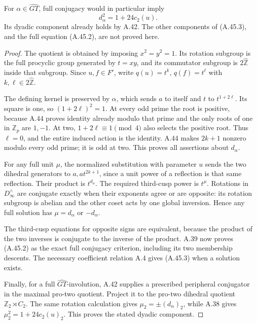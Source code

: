 For \(\alpha\in\widehat{GT}\), full conjugacy
would in particular imply
\[
                         d_\alpha^2=1+24c_2(u).
 \tag{A.45.3}
\]
Its dyadic component already holds by A.42.
The other components of (A.45.3), and the full
equation (A.45.2), are not proved here.

\begin{proof}
The quotient is obtained by imposing
\(x^2=y^2=1\). Its rotation subgroup is the
full procyclic group generated by \(t=xy\),
and its commutator subgroup is
\(2\widehat{\mathbb Z}\) inside that subgroup.
Since \(u,f\in F'\), write
\(q(u)=t^k\), \(q(f)=t^\ell\) with
\(k,\ell\in2\widehat{\mathbb Z}\).

The defining kernel is preserved by
\(\alpha\), which sends \(a\) to itself
and \(t\) to \(t^{1+2\ell}\).
Its square is one, so \((1+2\ell)^2=1\).
At every odd prime the root is positive,
because A.44 proves identity already modulo
that prime and the only roots of one in
\(\mathbb Z_p\) are \(1,-1\).
At two, \(1+2\ell\equiv1\pmod4\)
also selects the positive root. Thus
\(\ell=0\), and the entire induced action
is the identity. A.44 makes \(2k+1\)
nonzero modulo every odd prime; it is odd
at two. This proves all assertions about
\(d_\alpha\).

For any full unit \(\mu\), the normalized
substitution with parameter \(u\) sends the
two dihedral generators to
\(a,at^{2k+1}\), since a unit power of a
reflection is that same reflection. Their
product is \(t^{d_\alpha}\). The required
third-cusp power is \(t^\mu\). Rotations in
\(D_\infty^{\wedge}\) are conjugate exactly
when their exponents agree or are opposite:
its rotation subgroup is abelian and the
other coset acts by one global inversion.
Hence any full solution has
\(\mu=d_\alpha\) or \(-d_\alpha\).

The third-cusp equations for opposite signs
are equivalent, because the product of the
two inverses is conjugate to the inverse
of the product. A.39 now proves (A.45.2)
as the exact full conjugacy criterion,
including its two membership descents.
The necessary coefficient relation A.4
gives (A.45.3) when a solution exists.

Finally, for a full \(\widehat{GT}\)-involution,
A.42 supplies a prescribed peripheral
conjugator in the maximal pro-two quotient.
Project it to the pro-two dihedral quotient
\(\mathbb Z_2\rtimes C_2\). The same rotation
calculation gives \(\mu_2=\pm(d_\alpha)_2\),
while A.38 gives \(\mu_2^2=1+24c_2(u)_2\).
This proves the stated dyadic component.
\end{proof}

